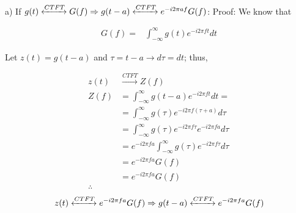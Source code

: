 \documentclass[11pt]{article}
\begin{document}
\begin{flushleft}
a) \newline
If $g(t) \xleftrightarrow{CTFT} G(f) \Rightarrow g(t-a) \xleftrightarrow{CTFT} e^{-i2\pi af}G(f)$:
\newline\newline
Proof:
\newline
We know that
\end{flushleft} 
\begin{equation*}
\begin{split}
G(f) = & \int_{-\infty}^{\infty} g(t)e^{-i2\pi ft} dt
\end{split}
\end{equation*}
\begin{flushleft}
Let $z(t) = g(t - a )$ and $\tau = t - a \rightarrow d\tau = dt$; thus,
\end{flushleft} 
\begin{equation*}
\begin{split}
    z(t)  & \xrightarrow{CTFT} Z(f) \\
    Z(f)  & = \int_{-\infty}^{\infty} g(t - a )e^{-i2\pi ft} dt = \\ 
                            & = \int_{-\infty}^{\infty} g(\tau )e^{-i2\pi f(\tau + a)} d\tau \\ 
                            & = \int_{-\infty}^{\infty} g(\tau )e^{-i2\pi f\tau} e^{-i2\pi fa} d\tau \\ 
                            & = e^{-i2\pi fa} \int_{-\infty}^{\infty} g(\tau )e^{-i2\pi f\tau} d\tau \\ 
                            & = e^{-i2\pi fa} G(f) \\
                            & = e^{-i2\pi fa} G(f) \\
                            \therefore{}
\end{split}
\end{equation*}
\begin{equation*}
\begin{split}
    z(t) \xleftrightarrow{CTFT} e^{-i2\pi fa} G(f) \Rightarrow g(t - a) \xleftrightarrow{CTFT} e^{-i2\pi fa} G(f)
\end{split}
\end{equation*}
\end{document}
